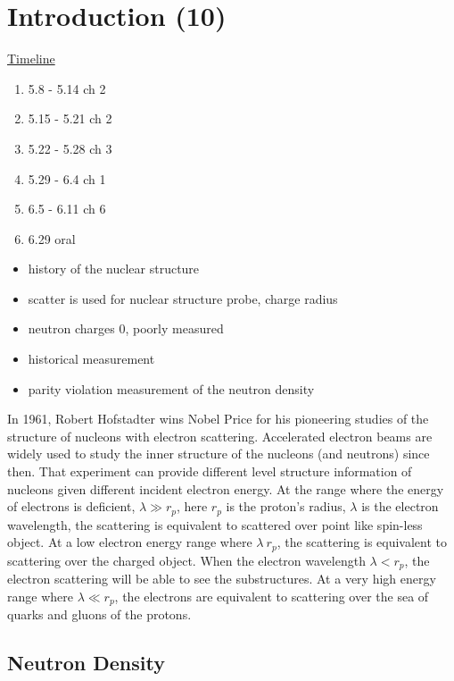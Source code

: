 \chapter{Introduction (10)}

\href{https://docs.google.com/spreadsheets/d/1sSxj0pFhz2N5CeNrXt-o7Ybs_TAdTg6Rkz5J-D-VANc/edit?usp=sharing}{Timeline}

\begin{enumerate}
    \item 5.8  - 5.14  ch 2
    \item 5.15 - 5.21  ch 2
    \item 5.22 - 5.28  ch 3
    \item 5.29 - 6.4   ch 1
    \item 6.5  - 6.11  ch 6
    \item 6.29 oral
\end{enumerate}



\begin{itemize}
    \item history of the nuclear structure
    \item scatter is used for nuclear structure probe, charge radius 
    \item neutron charges 0, poorly measured
    \item historical measurement 
    \item parity violation measurement of the neutron density
\end{itemize} 

In 1961, Robert Hofstadter wins Nobel Price for his pioneering studies of the structure of nucleons with  electron scattering. Accelerated electron beams are widely used to study the inner structure of the nucleons (and neutrons) since then. That experiment can provide different level structure information of nucleons given different incident electron energy. At the range where the energy of electrons is deficient, $\lambda \gg r_p$, here $r_p$ is the proton's radius, $\lambda$ is the electron wavelength, the scattering is equivalent to scattered over point like spin-less object. At a low electron energy range where $\lambda ~r_p$, the scattering is equivalent to scattering over the charged object. When the electron wavelength $\lambda < r_p$, the electron scattering will be able to see the substructures. At a very high energy range where $\lambda \ll r_p$, the electrons are equivalent to scattering over the sea of quarks and gluons of the protons. 

\section{Neutron Density}
